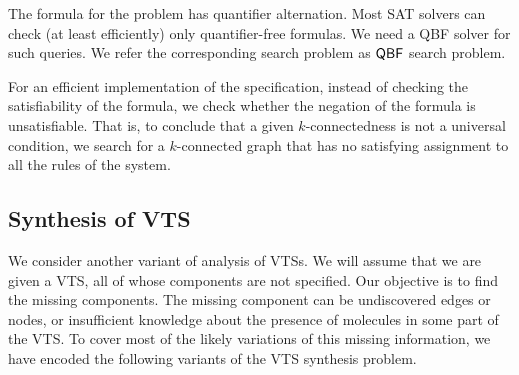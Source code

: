 %
 
The formula for the problem has quantifier alternation. 
%
Most SAT solvers can check (at least efficiently) only quantifier-free formulas.
%
%
We need a QBF solver for such queries. 
%
We refer the corresponding search problem as $\mathsf{QBF}$ search problem.
%

For an efficient implementation of the specification, instead of checking the satisfiability of the formula, we check whether the negation of the formula is unsatisfiable. 
%
That is, to conclude that a given $k$-connectedness is not a universal condition, we search for a $k$-connected graph that has no satisfying assignment to all the rules of the system.
%

%

\subsection{Synthesis of VTS}
%
\noindent We consider another variant of analysis of VTSs.
%
We will assume that we are given a VTS, all of whose components
are not specified.
%
Our objective is to find the missing components.
%
The missing component can
%
be undiscovered edges or nodes, or insufficient
knowledge about the presence of molecules in some part of the VTS.
%
To cover most of the likely variations of this missing information,
we have encoded the following variants of the VTS synthesis problem.

